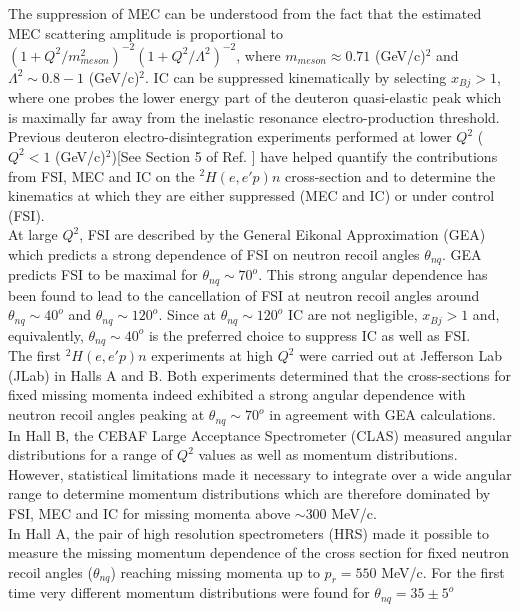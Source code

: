 The suppression of MEC can be understood from the fact that the estimated MEC scattering amplitude is proportional to  $(1 + Q^{2}/m^{2}_{meson})^{-2}(1+Q^{2}/\Lambda^{2})^{-2}$, where $m_{meson}\approx0.71$ (GeV/c)$^{2}$ and
$\Lambda^{2}\sim 0.8-1 $ (GeV/c)$^{2}$\cite{Sargsian_2001}. IC can be suppressed kinematically by selecting $x_{Bj}>1$, where one probes the lower energy part of the deuteron quasi-elastic peak which is maximally far away from the inelastic resonance
electro-production threshold.\\
\indent Previous deuteron electro-disintegration experiments performed at lower $Q^{2}$ ($Q^{2}<1$ (GeV/c)$^{2}$)[See Section 5 of Ref. \cite{sargsian_2015}] have helped quantify the contributions
from FSI, MEC and IC on the $^{2}H(e,e'p)n$ cross-section and to determine the kinematics at which they are either suppressed (MEC and IC) or under control (FSI).  \\
\indent At large $Q^{2}$, FSI are described by the General Eikonal Approximation (GEA)\cite{Sargsian_2001,PhysRevC.56.1124,sargsian_2015} which predicts a strong dependence of FSI on neutron recoil angles $\theta_{nq}$.
GEA predicts FSI to be maximal for $\theta_{nq}\sim70^{o}$. This strong angular dependence has been found to lead to the cancellation of FSI at neutron recoil angles around $\theta_{nq}\sim40^{o}$ and $\theta_{nq}\sim120^{o}$. Since at $\theta_{nq}\sim120^{o}$ IC are not negligible, $x_{Bj}>1$ and, equivalently,  $\theta_{nq}\sim40^{o}$ is the preferred choice to suppress IC as well as FSI. \\
\indent The first $^{2}H(e,e'p)n$ experiments at high $Q^{2}$ were carried out at Jefferson Lab (JLab) in Halls A\cite{PhysRevLett.89.062301} and B\cite{PhysRevLett.98.262502}. Both
experiments determined that the cross-sections for fixed missing momenta indeed exhibited a strong angular dependence with neutron recoil angles peaking
at $\theta_{nq} \sim 70^{o}$ in agreement with GEA\cite{Sargsian_2001,PhysRevC.56.1124} calculations. In Hall B, the CEBAF Large Acceptance Spectrometer (CLAS) measured angular
distributions for  a range of $Q^2$ values as well as momentum distributions. However, statistical limitations made it necessary to integrate over a wide angular range to determine momentum distributions
which are therefore dominated by  FSI, MEC and IC for missing momenta above $\sim 300$ MeV/c. \\
\indent In Hall A, the pair of high resolution spectrometers (HRS) made it possible to measure the missing  momentum dependence of the cross section for fixed neutron recoil angles ($\theta_{nq}$) reaching missing momenta up to $p_{r}=550$ MeV/c. For the first time very different momentum distributions were found for $\theta_{nq}=35\pm5^{o}$
